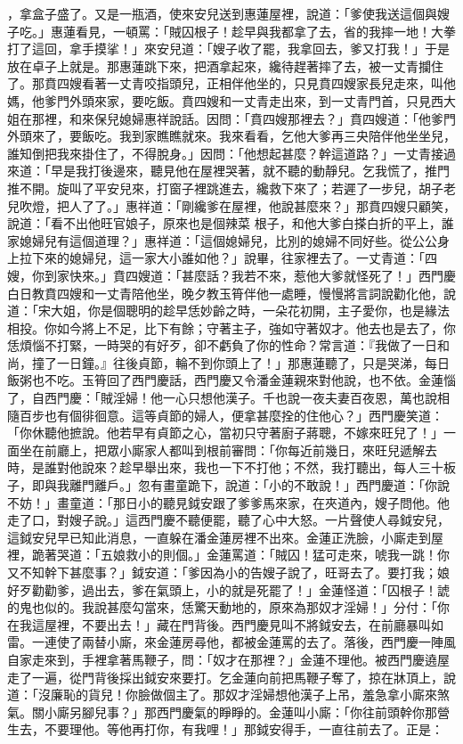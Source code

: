 \begin{showcontents}{}
，拿盒子盛了。又是一瓶酒，使來安兒送到惠蓮屋裡，說道：「爹使我送這個與嫂子吃。」惠蓮看見，一頓罵：「賊囚根子！趁早與我都拿了去，省的我摔一地！大拳打了這回，拿手摸挲！」來安兒道：「嫂子收了罷，我拿回去，爹又打我！」于是放在卓子上就是。那惠蓮跳下來，把酒拿起來，纔待趕著摔了去，被一丈青攔住了。那賁四嫂看著一丈青咬指頭兒，正相伴他坐的，只見賁四嫂家長兒走來，叫他媽，他爹門外頭來家，要吃飯。賁四嫂和一丈青走出來，到一丈青門首，只見西大姐在那裡，和來保兒媳婦惠祥說話。因問：「賁四嫂那裡去？」賁四嫂道：「他爹門外頭來了，要飯吃。我到家瞧瞧就來。我來看看，乞他大爹再三央陪伴他坐坐兒，誰知倒把我來掛住了，不得脫身。」因問：「他想起甚麼？幹這道路？」一丈青接過來道：「早是我打後邊來，聽見他在屋裡哭著，就不聽的動靜兒。乞我慌了，推門推不開。旋叫了平安兒來，打窗子裡跳進去，纔救下來了；若遲了一步兒，胡子老兒吹燈，把人了了。」惠祥道：「剛纔爹在屋裡，他說甚麼來？」那賁四嫂只顧笑，說道：「看不出他旺官娘子，原來也是個辣菜 根子，和他大爹白搽白折的平上，誰家媳婦兒有這個道理？」惠祥道：「這個媳婦兒，比別的媳婦不同好些。從公公身上拉下來的媳婦兒，這一家大小誰如他？」說畢，往家裡去了。一丈青道：「四嫂，你到家快來。」賁四嫂道：「甚麼話？我若不來，惹他大爹就怪死了！」西門慶白日教賁四嫂和一丈青陪他坐，晚夕教玉筲伴他一處睡，慢慢將言詞說勸化他，說道：「宋大姐，你是個聰明的趁早恁妙齡之時，一朵花初開，主子愛你，也是緣法相投。你如今將上不足，比下有餘；守著主子，強如守著奴才。他去也是去了，你恁煩惱不打緊，一時哭的有好歹，卻不虧負了你的性命？常言道：『我做了一日和尚，撞了一日鐘。』往後貞節，輪不到你頭上了！」那惠蓮聽了，只是哭涕，每日飯粥也不吃。玉筲回了西門慶話，西門慶又令潘金蓮親來對他說，也不依。金蓮惱了，自西門慶：「賊淫婦！他一心只想他漢子。千也說一夜夫妻百夜恩，萬也說相隨百步也有個徘徊意。這等貞節的婦人，便拿甚麼拴的住他心？」西門慶笑道：「你休聽他摭說。他若早有貞節之心，當初只守著廚子蔣聰，不嫁來旺兒了！」一面坐在前廳上，把眾小廝家人都叫到根前審問：「你每近前幾日，來旺兒遞解去時，是誰對他說來？趁早舉出來，我也一下不打他；不然，我打聽出，每人三十板子，即與我離門離戶。」忽有畫童跪下，說道：「小的不敢說！」西門慶道：「你說不妨！」畫童道：「那日小的聽見鉞安跟了爹爹馬來家，在夾道內，嫂子問他。他走了口，對嫂子說。」這西門慶不聽便罷，聽了心中大怒。一片聲使人尋鉞安兒，這鉞安兒早已知此消息，一直躲在潘金蓮房裡不出來。金蓮正洗臉，小廝走到屋裡，跪著哭道：「五娘救小的則個。」金蓮罵道：「賊囚！猛可走來，唬我一跳！你又不知幹下甚麼事？」鉞安道：「爹因為小的告嫂子說了，旺哥去了。要打我；娘好歹勸勸爹，過出去，爹在氣頭上，小的就是死罷了！」金蓮怪道：「囚根子！諕的鬼也似的。我說甚麼勾當來，恁驚天動地的，原來為那奴才淫婦！」分付：「你在我這屋裡，不要出去！」藏在門背後。西門慶見叫不將鉞安去，在前廳暴叫如雷。一連使了兩替小廝，來金蓮房尋他，都被金蓮罵的去了。落後，西門慶一陣風自家走來到，手裡拿著馬鞭子，問：「奴才在那裡？」金蓮不理他。被西門慶遶屋走了一遍，從門背後採出鉞安來要打。乞金蓮向前把馬鞭子奪了，掠在牀頂上，說道：「沒廉恥的貨兒！你臉做個主了。那奴才淫婦想他漢子上吊，羞急拿小廝來煞氣。關小廝另腳兒事？」那西門慶氣的睜睜的。金蓮叫小廝：「你往前頭幹你那營生去，不要理他。等他再打你，有我哩！」那鉞安得手，一直往前去了。正是：


\end{showcontents}
